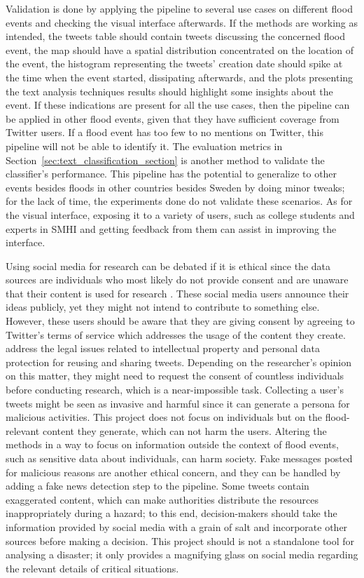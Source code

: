 Validation is done by applying the pipeline to several use cases on different flood events and
checking the visual interface afterwards. If the methods are working as intended, the tweets table
should contain tweets discussing the concerned flood event, the map should have a spatial
distribution concentrated on the location of the event, the histogram representing the tweets'
creation date should spike at the time when the event started, dissipating afterwards, and the plots
presenting the text analysis techniques results should highlight some insights about the event. If
these indications are present for all the use cases, then the pipeline can be applied in other flood
events, given that they have sufficient coverage from Twitter users. If a flood event has too few to
no mentions on Twitter, this pipeline will not be able to identify it. The evaluation metrics in
Section~\ref{sec:text_classification_section} is another method to validate the classifier's
performance. This pipeline has the potential to generalize to other events besides floods in other
countries besides Sweden by doing minor tweaks; for the lack of time, the experiments done do not
validate these scenarios. As for the visual interface, exposing it to a variety of users, such as
college students and experts in \ac{SMHI} and getting feedback from them can assist in improving the
interface.

Using social media for research can be debated if it is ethical since the data sources are
individuals who most likely do not provide consent and are unaware that their content is used for
research \cite{zimmerItEthicalHarvest2010}. These social media users announce their ideas publicly,
yet they might not intend to contribute to something else. However, these users should be aware that
they are giving consent by agreeing to Twitter's terms of service which addresses the usage of the
content they create.  address the legal issues related to
intellectual property and personal data protection for reusing and sharing tweets. Depending on the
researcher's opinion on this matter, they might need to request the consent of countless individuals
before conducting research, which is a near-impossible task. Collecting a user's tweets might be
seen as invasive and harmful since it can generate a persona for malicious activities. This project
does not focus on individuals but on the flood-relevant content they generate, which can not harm the
users. Altering the methods in a way to focus on information outside the context of flood events,
such as sensitive data about individuals, can harm society. Fake messages posted for malicious
reasons are another ethical concern, and they can be handled by adding a fake news detection step to
the pipeline. Some tweets contain exaggerated content, which can make authorities distribute the
resources inappropriately during a hazard; to this end, decision-makers should take the information
provided by social media with a grain of salt and incorporate other sources before making a
decision. This project should is not a standalone tool for analysing a disaster;  it only provides a
magnifying glass on social media regarding the relevant details of critical situations.
